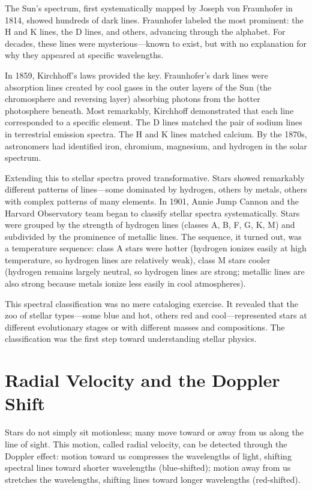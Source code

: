 The Sun's spectrum, first systematically mapped by Joseph von Fraunhofer in 1814, showed hundreds of dark lines. Fraunhofer labeled the most prominent: the H and K lines, the D lines, and others, advancing through the alphabet. For decades, these lines were mysterious—known to exist, but with no explanation for why they appeared at specific wavelengths.

In 1859, Kirchhoff's laws provided the key. Fraunhofer's dark lines were absorption lines created by cool gases in the outer layers of the Sun (the chromosphere and reversing layer) absorbing photons from the hotter photosphere beneath. Most remarkably, Kirchhoff demonstrated that each line corresponded to a specific element. The D lines matched the pair of sodium lines in terrestrial emission spectra. The H and K lines matched calcium. By the 1870s, astronomers had identified iron, chromium, magnesium, and hydrogen in the solar spectrum.

Extending this to stellar spectra proved transformative. Stars showed remarkably different patterns of lines—some dominated by hydrogen, others by metals, others with complex patterns of many elements. In 1901, Annie Jump Cannon and the Harvard Observatory team began to classify stellar spectra systematically. Stars were grouped by the strength of hydrogen lines (classes A, B, F, G, K, M) and subdivided by the prominence of metallic lines. The sequence, it turned out, was a temperature sequence: class A stars were hotter (hydrogen ionizes easily at high temperature, so hydrogen lines are relatively weak), class M stars cooler (hydrogen remains largely neutral, so hydrogen lines are strong; metallic lines are also strong because metals ionize less easily in cool atmospheres).

This spectral classification was no mere cataloging exercise. It revealed that the zoo of stellar types—some blue and hot, others red and cool—represented stars at different evolutionary stages or with different masses and compositions. The classification was the first step toward understanding stellar physics.

\section{Radial Velocity and the Doppler Shift}

Stars do not simply sit motionless; many move toward or away from us along the line of sight. This motion, called radial velocity, can be detected through the Doppler effect: motion toward us compresses the wavelengths of light, shifting spectral lines toward shorter wavelengths (blue-shifted); motion away from us stretches the wavelengths, shifting lines toward longer wavelengths (red-shifted).

